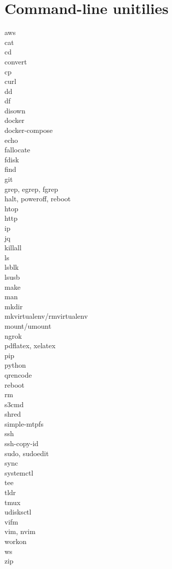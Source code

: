 \documentclass [8pt] {extarticle}
\begin{document}
    \section {Command-line unitilies}

    aws \\
    cat \\
    cd \\
    convert \\
    cp \\
    curl \\
    dd \\
    df \\
    disown  \\
    docker \\
    docker-compose \\
    echo \\
    fallocate \\
    fdisk \\
    find \\
    git \\
    grep, egrep, fgrep \\
    halt, poweroff, reboot \\
    htop \\
    http \\
    ip \\
    jq \\
    killall \\
    ls \\
    lsblk \\
    lsusb \\
    make \\
    man \\
    mkdir \\
    mkvirtualenv/rmvirtualenv \\
    mount/umount \\
    ngrok \\
    pdflatex, xelatex \\
    pip \\
    python \\
    qrencode \\
    reboot \\
    rm \\
    s3cmd \\
    shred \\
    simple-mtpfs \\
    ssh \\
    ssh-copy-id \\
    sudo, sudoedit \\
    sync \\
    systemctl \\
    tee \\
    tldr \\
    tmux \\
    udisksctl \\
    vifm \\
    vim, nvim \\
    workon \\
    ws \\
    zip \\
\end{document}
